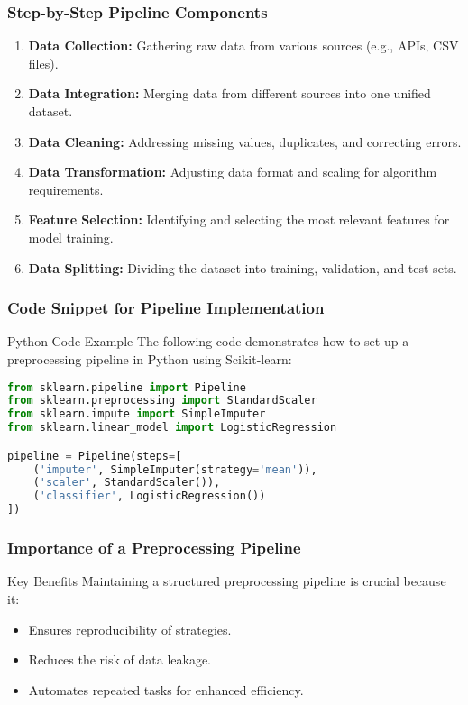 \documentclass[aspectratio=169]{beamer}
\begin{document}
\begin{frame}[fragile]
    \frametitle{Step-by-Step Pipeline Components}
    \begin{enumerate}
        \item \textbf{Data Collection:} Gathering raw data from various sources (e.g., APIs, CSV files).
        \item \textbf{Data Integration:} Merging data from different sources into one unified dataset.
        \item \textbf{Data Cleaning:} Addressing missing values, duplicates, and correcting errors.
        \item \textbf{Data Transformation:} Adjusting data format and scaling for algorithm requirements.
        \item \textbf{Feature Selection:} Identifying and selecting the most relevant features for model training.
        \item \textbf{Data Splitting:} Dividing the dataset into training, validation, and test sets.
    \end{enumerate}
\end{frame}

\begin{frame}[fragile]
    \frametitle{Code Snippet for Pipeline Implementation}
    \begin{block}{Python Code Example}
        The following code demonstrates how to set up a preprocessing pipeline in Python using Scikit-learn:
        \begin{lstlisting}[language=Python]
from sklearn.pipeline import Pipeline
from sklearn.preprocessing import StandardScaler
from sklearn.impute import SimpleImputer
from sklearn.linear_model import LogisticRegression

pipeline = Pipeline(steps=[
    ('imputer', SimpleImputer(strategy='mean')),
    ('scaler', StandardScaler()),
    ('classifier', LogisticRegression())
])
        \end{lstlisting}
    \end{block}
\end{frame}

\begin{frame}[fragile]
    \frametitle{Importance of a Preprocessing Pipeline}
    \begin{block}{Key Benefits}
        Maintaining a structured preprocessing pipeline is crucial because it:
        \begin{itemize}
            \item Ensures reproducibility of strategies.
            \item Reduces the risk of data leakage.
            \item Automates repeated tasks for enhanced efficiency.
        \end{itemize}
    \end{block}
\end{frame}
\end{document}
